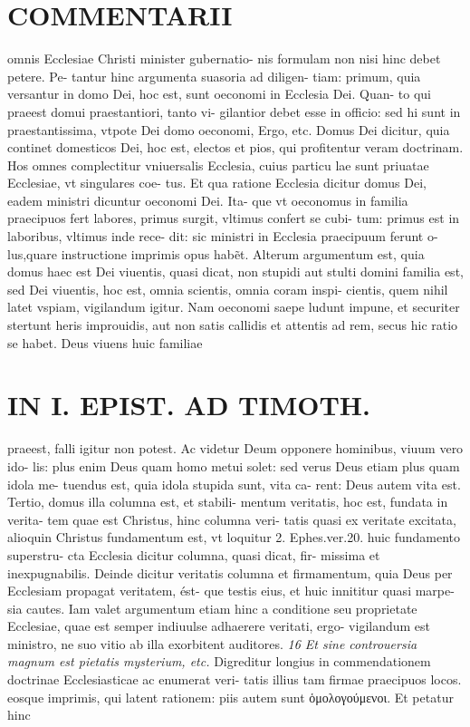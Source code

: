 \documentclass{article}
\begin{document}
\begin{pages}
\section*{COMMENTARII }\pstart omnis Ecclesiae Christi minister gubernatio- nis formulam non nisi hinc debet petere. Pe- tantur hinc argumenta suasoria ad diligen- tiam: primum, quia versantur in domo Dei, hoc est, sunt oeconomi in Ecclesia Dei. Quan- to qui praeest domui praestantiori, tanto vi- gilantior debet esse in officio: sed hi sunt in praestantissima, vtpote Dei domo oeconomi, Ergo, etc. Domus Dei dicitur, quia continet domesticos Dei, hoc est, electos et pios, qui profitentur veram doctrinam. Hos omnes complectitur vniuersalis Ecclesia, cuius particu lae sunt priuatae Ecclesiae, vt singulares coe- tus. Et qua ratione Ecclesia dicitur domus Dei, eadem ministri dicuntur oeconomi Dei. Ita- que vt oeconomus in familia praecipuos fert labores, primus surgit, vltimus confert se cubi- tum: primus est in laboribus, vltimus inde rece- dit: sic ministri in Ecclesia praecipuum ferunt o- lus,quare instructione imprimis opus habẽt.  \pend\pstart Alterum argumentum est, quia domus haec est Dei viuentis, quasi dicat, non stupidi aut stulti domini familia est, sed Dei viuentis, hoc est, omnia scientis, omnia coram inspi- cientis, quem nihil latet vspiam, vigilandum igitur. Nam oeconomi saepe ludunt impune, et securiter stertunt heris improuidis, aut non satis callidis et attentis ad rem, secus hic ratio se habet. Deus viuens huic familiae  \pend
\section*{IN I. EPIST. AD TIMOTH. }
\marginpar{[ p.79 ]}\pstart praeest, falli igitur non potest. Ac videtur Deum opponere hominibus, viuum vero ido- lis: plus enim Deus quam homo metui solet: sed verus Deus etiam plus quam idola me- tuendus est, quia idola stupida sunt, vita ca- rent: Deus autem vita est.  \pend\pstart Tertio, domus illa columna est, et stabili- mentum veritatis, hoc est, fundata in verita- tem quae est Christus, hinc columna veri- tatis quasi ex veritate excitata, alioquin Christus fundamentum est, vt loquitur 2. Ephes.ver.20. huic fundamento superstru- cta Ecclesia dicitur columna, quasi dicat, fir- missima et inexpugnabilis. Deinde dicitur veritatis columna et firmamentum, quia Deus per Ecclesiam propagat veritatem, ést- que testis eius, et huic innititur quasi marpe- sia cautes. Iam valet argumentum etiam hinc a conditione seu proprietate Ecclesiae, quae est semper indiuulse adhaerere veritati, ergo- vigilandum est ministro, ne suo vitio ab illa exorbitent auditores.  \pend
\textit{16 Et sine controuersia magnum est pietatis mysterium, etc. }\pstart Digreditur longius in commendationem doctrinae Ecclesiasticae ac enumerat veri- tatis illius tam firmae praecipuos locos. eosque imprimis, qui latent rationem: piis autem sunt ὁμολογούμενοι. Et petatur hinc  \pend
\marginpar{[ p.80 ]}

\end{pages}
\end{document}
